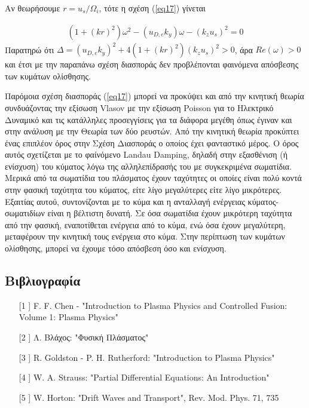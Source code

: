 \documentclass[a4paper]{article}
\begin{document}
Αν θεωρήσουμε $r=u_s/\Omega_i$, τότε η σχέση (\ref{eq17}) γίνεται

\begin{align*}
    (1+(kr)^2)\omega^2 -(u_{D,e}k_y)\omega -(k_zu_s)^2 =0 
\end{align*}
  Παρατηρώ ότι $\Delta = (u_{D,e}k_y)^2+4(1+(kr)^2)(k_zu_s)^2 >0$, άρα $Re(\omega)>0$ και έτσι με την παραπάνω σχέση διασποράς δεν προβλέπονται φαινόμενα απόσβεσης των κυμάτων ολίσθησης.
  
  Παρόμοια σχέση διασποράς (\ref{eq17}) μπορεί να προκύψει και από την κινητική θεωρία συνδυάζοντας την εξίσωση Vlasov με την εξίσωση Poisson για το Ηλεκτρικό Δυναμικό και τις κατάλληλες προσεγγίσεις για τα διάφορα μεγέθη όπως έγιναν και στην ανάλυση με την Θεωρία των δύο ρευστών. Από την κινητική θεωρία προκύπτει ένας επιπλέον όρος στην Σχέση Διασποράς ο οποίος έχει φανταστικό μέρος. Ο όρος αυτός σχετίζεται με το φαίνόμενο Landau Damping, δηλαδή στην εξασθένιση (ή ενίσχυση) του κύματος λόγω της αλληλεπίδρασής του με συγκεκριμένα σωματίδια. Μερικά από τα σωματίδια του πλάσματος έχουν ταχύτητες οι οποίες είναι πολύ κοντά στην φασική ταχύτητα του κύματος, είτε λίγο μεγαλύτερες είτε λίγο μικρότερες. Εξαιτίας αυτού, συντονίζονται με το κύμα και η ανταλλαγή ενέργειας κύματος-σωματιδίων είναι η βέλτιστη δυνατή. Σε όσα σωματίδια έχουν μικρότερη ταχύτητα από την φασική, εναποτίθεται ενέργεια από το κύμα, ενώ όσα έχουν μεγαλύτερη, μεταφέρουν την κινητική τους ενέργεια στο κύμα. Στην περίπτωση των κυμάτων ολίσθησης, μπορεί να έχουμε τόσο απόσβεση όσο και ενίσχυση.
  				
  			
  	
  	
  	
  			\subsection*{Βιβλιογραφία}
  				\begin{itemize}
  					\item[[1]] F. F. Chen - "Introduction to Plasma Physics and Controlled Fusion: Volume 1: Plasma Physics" 
  					\item[[2]] Λ. Βλάχος: "Φυσική Πλάσματος"
  					\item[[3]] R. Goldston - P. H. Rutherford: "Introduction to Plasma Physics"
  					\item[[4]] W. A. Strauss: "Partial Differential Equations: An Introduction"
  					\item[[5]] W. Horton: "Drift Waves and Transport", Rev. Mod. Phys. 71, 735 
  				\end{itemize}
\end{document}
